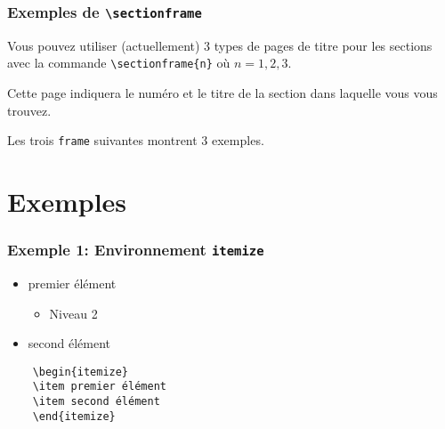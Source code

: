 \documentclass[aspectratio=169]{beamer}
\begin{document}
\begin{frame} 
    \frametitle{Exemples de \texttt{\textbackslash sectionframe}}

    Vous pouvez utiliser (actuellement) 3 types de pages de titre pour
    les sections avec la commande \texttt{\textbackslash sectionframe\{n\}} 
    où $n=1,2,3$.\newline

    Cette page indiquera le numéro et le titre de la section dans laquelle
    vous vous trouvez.\newline

    Les trois \texttt{frame} suivantes montrent 3 exemples.
\end{frame}

\section{Exemples}

\begin{frame}[fragile]
    \frametitle{Exemple 1: Environnement \texttt{itemize}}
\begin{itemize}
    \item premier élément 
        \begin{itemize}
            \item Niveau 2
        \end{itemize}
    \item second élément
\end{itemize}
\begin{verbatim}
    \begin{itemize}
    \item premier élément 
    \item second élément
    \end{itemize}
\end{verbatim}
\end{frame}
\end{document}
